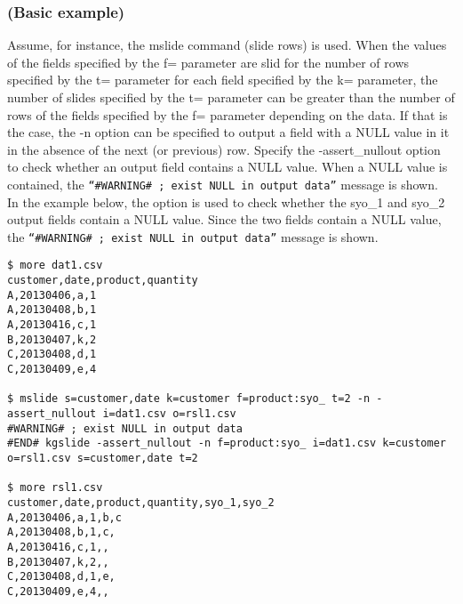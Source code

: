 \subsubsection*{(Basic example)}
Assume, for instance, the mslide command (slide rows) is used. When the values of the fields specified by the f= parameter are slid for the number of rows specified by the t= parameter for each field specified by the k= parameter, the number of slides specified by the t= parameter can be greater than the number of rows of the fields specified by the f= parameter depending on the data. If that is the case, the -n option can be specified to output a field with a NULL value in it in the absence of the next (or previous) row. Specify the -assert\_nullout option to check whether an output field contains a NULL value. When a NULL value is contained, the \verb|“#WARNING# ; exist NULL in output data”| message is shown.
\\In the example below, the option is used to check whether the syo\_1 and syo\_2 output fields contain a NULL value. Since the two fields contain a NULL value, the \verb|“#WARNING# ; exist NULL in output data”| message is shown.

\begin{Verbatim}[baselinestretch=0.7,frame=single]
$ more dat1.csv
customer,date,product,quantity
A,20130406,a,1
A,20130408,b,1
A,20130416,c,1
B,20130407,k,2
C,20130408,d,1
C,20130409,e,4

$ mslide s=customer,date k=customer f=product:syo_ t=2 -n -assert_nullout i=dat1.csv o=rsl1.csv
#WARNING# ; exist NULL in output data
#END# kgslide -assert_nullout -n f=product:syo_ i=dat1.csv k=customer o=rsl1.csv s=customer,date t=2

$ more rsl1.csv
customer,date,product,quantity,syo_1,syo_2
A,20130406,a,1,b,c
A,20130408,b,1,c,
A,20130416,c,1,,
B,20130407,k,2,,
C,20130408,d,1,e,
C,20130409,e,4,,
\end{Verbatim}
